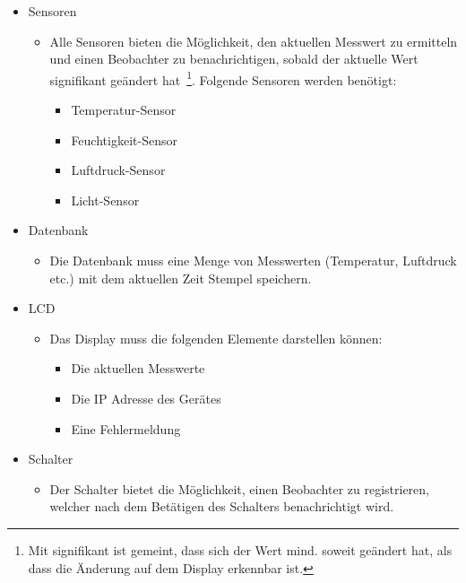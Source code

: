 \documentclass[
    10pt,
    a4paper,
]{scrartcl}
\begin{document}
\begin{itemize}
    \item Sensoren
        \begin{itemize}
            \item Alle Sensoren bieten die Möglichkeit, den aktuellen Messwert zu
                ermitteln und einen Beobachter zu benachrichtigen, sobald der
                aktuelle Wert signifikant geändert hat~\footnote{Mit signifikant
                ist gemeint, dass sich der Wert mind. soweit geändert hat, als dass die
                Änderung auf dem Display erkennbar ist.}. Folgende Sensoren werden
                benötigt:
                \begin{itemize}
                    \item Temperatur-Sensor
                    \item Feuchtigkeit-Sensor
                    \item Luftdruck-Sensor
                    \item Licht-Sensor
                \end{itemize}
        \end{itemize}
    \item Datenbank
        \begin{itemize}
            \item Die Datenbank muss eine Menge von Messwerten (Temperatur, Luftdruck
                etc.) mit dem aktuellen Zeit Stempel speichern.
        \end{itemize}
    \item LCD
        \begin{itemize}
            \item Das Display muss die folgenden Elemente darstellen können:
                \begin{itemize}
                    \item Die aktuellen Messwerte
                    \item Die IP Adresse des Gerätes
                    \item Eine Fehlermeldung
                \end{itemize}
        \end{itemize}
    \item Schalter
        \begin{itemize}
            \item Der Schalter bietet die Möglichkeit, einen Beobachter zu registrieren,
                welcher nach dem Betätigen des Schalters benachrichtigt wird.
        \end{itemize}
\end{itemize}
\end{document}
